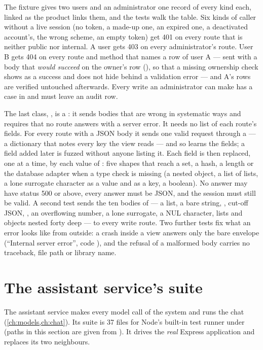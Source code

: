 The fixture gives two users and an administrator one record of every kind each, linked as the
product links them, and the tests walk the table. Six kinds of caller without a live session
(no token, a made-up one, an expired one, a deactivated account's, the wrong scheme, an empty
token) get 401 on every route that is neither public nor internal. A user gets 403 on every
administrator's route. User B gets 404 on every route and method that names a row of user A
--- sent with a body that \emph{would succeed} on the owner's row (), so
that a missing ownership check shows as a success and does not hide behind a validation error
--- and A's rows are verified untouched afterwards. Every write an administrator can make has
a case in  and must leave an audit row.

The last class, , is a : it sends bodies that are wrong
in systematic ways and requires that no route answers with a server error. It needs no list of
each route's fields. For every route with a JSON body it sends one valid request through a
 --- a dictionary that notes every key the view reads --- and so learns the
fields; a field added later is fuzzed without anyone listing it. Each field is then replaced,
one at a time, by each value of : five shapes that reach a set, a hash, a
length or the database adapter when a type check is missing (a nested object, a list of lists,
a lone surrogate character as a value and as a key, a boolean). No answer may have status 500
or above, every answer must be JSON, and the session must still be valid. A second test sends
the ten bodies of  --- a list, a bare string, , cut-off JSON,
, an overflowing number, a lone surrogate, a NUL character, lists and objects nested
forty deep --- to every write route. Two further tests fix what an error looks like from
outside: a crash inside a view answers only the bare envelope (\enquote{Internal server error},
code ), and the refusal of a malformed body carries no traceback, file path
or library name.


\section{The assistant service's suite}\label{sec:testing:assistant}

The assistant service makes every model call of the system and runs the chat
(\cref{ch:models,ch:chat}). Its suite is 37 files for Node's built-in test runner under
 (paths in this section are given from ). It drives the
\emph{real} Express application and replaces its two neighbours.

